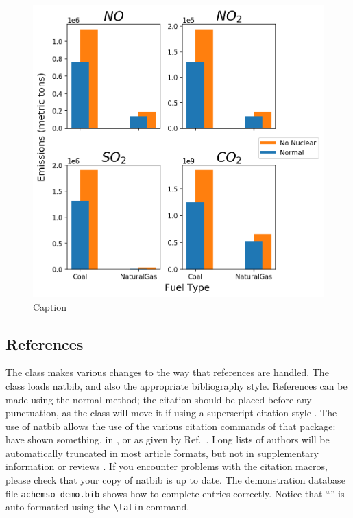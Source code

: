 \documentclass[journal=jacsat,manuscript=article]{achemso}
\begin{document}
\begin{figure}
    \centering
    \includegraphics{ego_nonuclear_project/Figures/emissions_fueltype.png}
    \caption{Caption}
    \label{fig:my_label}
\end{figure}
\subsection{References}

The class makes various changes to the way that references are
handled.  The class loads \textsf{natbib}, and also the
appropriate bibliography style.  References can be made using
the normal method; the citation should be placed before any
punctuation, as the class will move it if using a superscript
citation style
\cite{Mena2000,Abernethy2003,Friedman-Hill2003,EuropeanCommission2008}.
The use of \textsf{natbib} allows the use of the various citation
commands of that package: \citeauthor{Abernethy2003} have shown
something, in \citeyear{Cotton1999}, or as given by
Ref.~.  Long lists of authors will be
automatically truncated in most article formats, but not in
supplementary information or reviews \cite{Pople2003}. If you
encounter problems with the citation macros, please check that
your copy of \textsf{natbib} is up to date. The demonstration
database file \texttt{achemso-demo.bib} shows how to complete
entries correctly. Notice that ``'' is auto-formatted
using the \texttt{\textbackslash latin} command.
\end{document}
